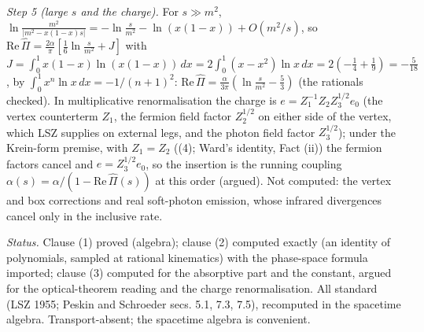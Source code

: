 \emph{Step 5 (large $s$ and the charge).} For $s \gg m^{2}$, $\ln\frac{m^{2}}{|m^{2} - x(1-x)s|} = -\ln\frac{s}{m^{2}} - \ln(x(1-x)) + O(m^{2}/s)$, so $\mathrm{Re}\,\hat\Pi = \tfrac{2\alpha}{\pi}[\tfrac16\ln\tfrac{s}{m^{2}} + J]$ with $J = \int_{0}^{1}x(1-x)\ln(x(1-x))\,dx = 2\int_{0}^{1}(x - x^{2})\ln x\,dx = 2(-\tfrac14 + \tfrac19) = -\tfrac{5}{18}$, by $\int_{0}^{1}x^{n}\ln x\,dx = -1/(n+1)^{2}$: $\mathrm{Re}\,\hat\Pi = \tfrac{\alpha}{3\pi}(\ln\tfrac{s}{m^{2}} - \tfrac53)$ (the rationals checked). In multiplicative renormalisation the charge is $e = Z_{1}^{-1}Z_{2}Z_{3}^{1/2}e_{0}$ (the vertex counterterm $Z_{1}$, the fermion field factor $Z_{2}^{1/2}$ on either side of the vertex, which LSZ supplies on external legs, and the photon field factor $Z_{3}^{1/2}$); under the Krein-form premise, with $Z_{1} = Z_{2}$ ((4); Ward's identity, Fact (ii)) the fermion factors cancel and $e = Z_{3}^{1/2}e_{0}$, so the insertion is the running coupling $\alpha(s) = \alpha/(1 - \mathrm{Re}\,\hat\Pi(s))$ at this order (argued). Not computed: the vertex and box corrections and real soft-photon emission, whose infrared divergences cancel only in the inclusive rate.

\emph{Status.} Clause (1) proved (algebra); clause (2) computed exactly (an identity of polynomials, sampled at rational kinematics) with the phase-space formula imported; clause (3) computed for the absorptive part and the constant, argued for the optical-theorem reading and the charge renormalisation. All standard (LSZ 1955; Peskin and Schroeder secs. 5.1, 7.3, 7.5), recomputed in the spacetime algebra. Transport-absent; the spacetime algebra is convenient.
